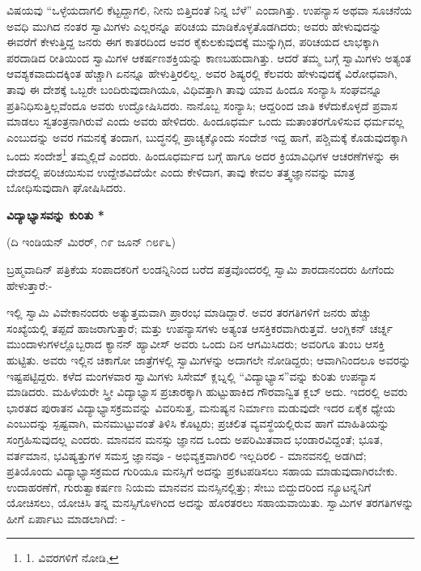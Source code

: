 ವಿಷಯವು “ಒಳ್ಳೆಯದಾಗಲಿ ಕೆಟ್ಟದ್ದಾಗಲಿ, ನೀನು ಬಿತ್ತಿದಂತೆ ನಿನ್ನ ಬೆಳೆ” ಎಂದಾಗಿತ್ತು. ಉಪನ್ಯಾಸ ಅಥವಾ ಸೂಚನೆಯ ಅವಧಿ ಮುಗಿದ ನಂತರ ಸ್ವಾಮಿಗಳು ಎಲ್ಲರನ್ನೂ ಪರಿಚಯ ಮಾಡಿಕೊಳ್ಳತೊಡಗಿದರು; ಅವರು ಹೇಳುವುದನ್ನು ಈವರೆಗೆ ಕೇಳುತ್ತಿದ್ದ ಜನರು ಈಗ ಕಾತರದಿಂದ ಅವರ ಕೈಕುಲಕುವುದಕ್ಕೆ ಮುನ್ನುಗ್ಗಿದ, ಪರಿಚಯದ ಲಾಭಕ್ಕಾಗಿ ಪರದಾಡಿದ ರೀತಿಯಿಂದ ಸ್ವಾಮಿಗಳ ಆಕರ್ಷಣಶಕ್ತಿಯನ್ನು ಕಾಣಬಹುದಾಗಿತ್ತು. ಆದರೆ ತಮ್ಮ ಬಗ್ಗೆ ಸ್ವಾಮಿಗಳು ಅತ್ಯಂತ ಆವಶ್ಯಕವಾದುದಕ್ಕಿಂತ ಹೆಚ್ಚಾಗಿ ಏನನ್ನೂ ಹೇಳುತ್ತಿರಲಿಲ್ಲ. ಅವರ ಶಿಷ್ಯರಲ್ಲಿ ಕೆಲವರು ಹೇಳುವುದಕ್ಕೆ ವಿರೋಧವಾಗಿ, ತಾವು ಈ ದೇಶಕ್ಕೆ ಒಬ್ಬರೇ ಬಂದಿರುವುದಾಗಿಯೂ, ವಿಧಿವತ್ತಾಗಿ ತಾವು ಯಾವ ಹಿಂದೂ ಸಂನ್ಯಾಸಿ ಸಂಘವನ್ನೂ ಪ್ರತಿನಿಧಿಸುತ್ತಿಲ್ಲವೆಂದೂ ಅವರು ಉದ್ಘೋಷಿಸಿದರು. ನಾನೊಬ್ಬ ಸಂನ್ಯಾಸಿ; ಆದ್ದರಿಂದ ಜಾತಿ ಕಳೆದುಕೊಳ್ಳದೆ ಪ್ರವಾಸ ಮಾಡಲು ಸ್ವತಂತ್ರನಾಗಿರುವೆ ಎಂದು ಅವರು ಹೇಳಿದರು. ಹಿಂದೂಧರ್ಮ ಒಂದು ಮತಾಂತರಗೊಳಿಸುವ ಧರ್ಮವಲ್ಲ ಎಂಬುದನ್ನು ಅವರ ಗಮನಕ್ಕೆ ತಂದಾಗ, ಬುದ್ಧನಲ್ಲಿ ಪ್ರಾಚ್ಯಕ್ಕೊಂದು ಸಂದೇಶ ಇದ್ದ ಹಾಗೆ, ಪಶ್ಚಿಮಕ್ಕೆ ಕೊಡುವುದಕ್ಕಾಗಿ ಒಂದು ಸಂದೇಶ\footnote{1. ವಿವರಗಳಿಗೆ ನೋಡಿ, } ತಮ್ಮಲ್ಲಿದೆ ಎಂದರು. ಹಿಂದೂಧರ್ಮದ ಬಗ್ಗೆ ಹಾಗೂ ಅದರ ಕ್ರಿಯಾವಿಧಿಗಳ ಆಚರಣೆಗಳನ್ನು ಈ ದೇಶದಲ್ಲಿ ಪರಿಚಯಿಸುವ ಉದ್ದೇಶವಿದೆಯೇ ಎಂದು ಕೇಳಿದಾಗ, ತಾವು ಕೇವಲ ತತ್ತ್ವಜ್ಞಾನವನ್ನು ಮಾತ್ರ ಬೋಧಿಸುವುದಾಗಿ ಘೋಷಿಸಿದರು.

\begin{center}
\textbf{ವಿದ್ಯಾಭ್ಯಾಸವನ್ನು ಕುರಿತು *}
\end{center}

\begin{center}
(ದಿ ಇಂಡಿಯನ್ ಮಿರರ್, ೧೯ ಜೂನ್ ೧೮೯೬)
\end{center}

ಬ್ರಹ್ಮವಾದಿನ್ ಪತ್ರಿಕೆಯ ಸಂಪಾದಕರಿಗೆ ಲಂಡನ್ನಿನಿಂದ ಬರೆದ ಪತ್ರವೊಂದರಲ್ಲಿ ಸ್ವಾಮಿ ಶಾರದಾನಂದರು ಹೀಗೆಂದು ಹೇಳುತ್ತಾರೆ:-

ಇಲ್ಲಿ ಸ್ವಾಮಿ ವಿವೇಕಾನಂದರು ಅತ್ಯುತ್ತಮವಾಗಿ ಪ್ರಾರಂಭ ಮಾಡಿದ್ದಾರೆ. ಅವರ ತರಗತಿಗಳಿಗೆ ಜನರು ಹೆಚ್ಚು ಸಂಖ್ಯೆಯಲ್ಲಿ ತಪ್ಪದೆ ಹಾಜರಾಗುತ್ತಾರೆ; ಮತ್ತು ಉಪನ್ಯಾಸಗಳು ಅತ್ಯಂತ ಆಸಕ್ತಿಕರವಾಗಿರುತ್ತವೆ. ಆಂಗ್ಲಿಕನ್ ಚರ್ಚ್ನ ಮುಂದಾಳುಗಳಲ್ಲೊಬ್ಬರಾದ ಕ್ಯಾನನ್ ಹ್ಯಾವೀಸ್ ಅವರು ಒಂದು ದಿನ ಆಗಮಿಸಿದರು; ಅವರಿಗೂ ತುಂಬ ಆಸಕ್ತಿ ಹುಟ್ಟಿತು. ಅವರು ಇಲ್ಲಿನ ಚಿಕಾಗೋ ಜಾತ್ರೆಗಳಲ್ಲಿ ಸ್ವಾಮಿಗಳನ್ನು ಅದಾಗಲೇ ನೋಡಿದ್ದರು; ಆವಾಗಿನಿಂದಲೂ ಅವರನ್ನು ಇಷ್ಟಪಟ್ಟಿದ್ದರು. ಕಳೆದ ಮಂಗಳವಾರ ಸ್ವಾಮಿಗಳು ಸಿಸೇಮ್​ ಕ್ಲಬ್ನಲ್ಲಿ “ವಿದ್ಯಾಭ್ಯಾಸ”ವನ್ನು ಕುರಿತು ಉಪನ್ಯಾಸ ಮಾಡಿದರು. ಮಹಿಳೆಯರೇ ಸ್ತ್ರೀ ವಿದ್ಯಾಭ್ಯಾಸ ಪ್ರಚಾರಕ್ಕಾಗಿ ಹುಟ್ಟುಹಾಕಿದ ಗೌರವಾನ್ವಿತ ಕ್ಲಬ್ ಅದು. ಇದರಲ್ಲಿ ಅವರು ಭಾರತದ ಪುರಾತನ ವಿದ್ಯಾಭ್ಯಾಸಕ್ರಮವನ್ನು ವಿವರಿಸುತ್ತ, ಮನುಷ್ಯನ ನಿರ್ಮಾಣ ಮಡುವುದೇ ಇದರ ಏಕೈಕ ಧ್ಯೇಯ ಎಂಬುದನ್ನು ಸ್ಪಷ್ಟವಾಗಿ, ಮನಮುಟ್ಟುವಂತೆ ತಿಳಿಸಿ ಕೊಟ್ಟರು; ಪ್ರಚಲಿತ ವ್ಯವಸ್ಥೆಯಲ್ಲಿರುವ ಹಾಗೆ ಮಾಹಿತಿಯನ್ನು ಸಂಗ್ರಹಿಸುವುದಲ್ಲ ಎಂದರು. ಮಾನವನ ಮನಸ್ಸು ಜ್ಞಾನದ ಒಂದು ಅಪರಿಮಿತವಾದ ಭಂಡಾರವಿದ್ದಂತೆ; ಭೂತ, ವರ್ತಮಾನ, ಭವಿಷ್ಯತ್ತುಗಳ ಸಮಸ್ತ ಜ್ಞಾನವೂ - ಅಭಿವ್ಯಕ್ತವಾಗಿರಲಿ ಇಲ್ಲದಿರಲಿ - ಮಾನವನಲ್ಲಿ ಅಡಗಿದೆ; ಪ್ರತಿಯೊಂದು ವಿದ್ಯಾಭ್ಯಾಸಕ್ರಮದ ಗುರಿಯೂ ಮನಸ್ಸಿಗೆ ಅದನ್ನು ಪ್ರಕಟಪಡಿಸಲು ಸಹಾಯ ಮಾಡುವುದಾಗಿರಬೇಕು. ಉದಾಹರಣೆಗೆ, ಗುರುತ್ವಾಕರ್ಷಣ ನಿಯಮ ಮಾನವನ ಮನಸ್ಸಿನಲ್ಲಿತ್ತು; ಸೇಬು ಬಿದ್ದುದರಿಂದ ನ್ಯೂಟನ್ನನಿಗೆ ಯೋಚಿಸಲು, ಯೋಚಿಸಿ ತನ್ನ ಮನಸ್ಸಿಗೊಳಗಿಂದ ಅದನ್ನು ಹೊರತರಲು ಸಹಾಯವಾಯಿತು. ಸ್ವಾಮಿಗಳ ತರಗತಿಗಳನ್ನು ಹೀಗೆ ಏರ್ಪಾಟು ಮಾಡಲಾಗಿದೆ: -

